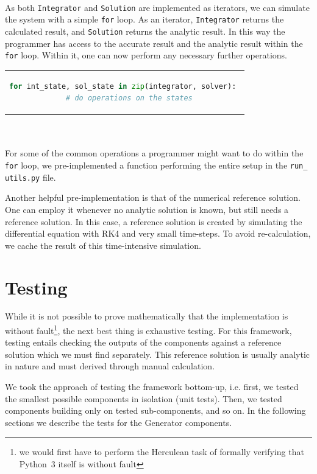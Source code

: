 \\
As both \texttt{Integrator} and \texttt{Solution} are implemented as iterators, we can simulate the system with a simple \texttt{for} loop.
As an iterator, \texttt{Integrator} returns the calculated result, and \texttt{Solution} returns the analytic result.
In this way the programmer has access to the accurate result and the analytic result within the \texttt{for} loop.
Within it, one can now perform any necessary further operations.\\
\begin{tabular}{c}
\begin{lstlisting}[language=Python]
for int_state, sol_state in zip(integrator, solver): 
  # do operations on the states
\end{lstlisting}
\end{tabular}
\\\\
For some of the common operations a programmer might want to do within the \texttt{for} loop, we pre-implemented a function performing the entire setup in the \texttt{run\_ utils.py} file.

Another helpful pre-implementation is that of the numerical reference solution.
One can employ it whenever no analytic solution is known, but still needs a reference solution.
In this case, a reference solution is created by simulating the differential equation with RK4 and very small time-steps.
To avoid re-calculation, we cache the result of this time-intensive simulation.

\section{Testing}\label{sec:testing}
While it is not possible to prove mathematically that the implementation is without fault\footnote{we would first have to perform the Herculean task of formally verifying that Python~3 itself is without fault}, the next best thing is exhaustive testing.
For this framework, testing entails checking the outputs of the components against a reference solution which we must find separately.
This reference solution is usually analytic in nature and must derived through manual calculation.

We took the approach of testing the framework bottom-up, i.e. first, we tested the smallest possible components in isolation (unit tests).
Then, we tested components building only on tested sub-components, and so on.
In the following sections we describe the tests for the Generator components.

